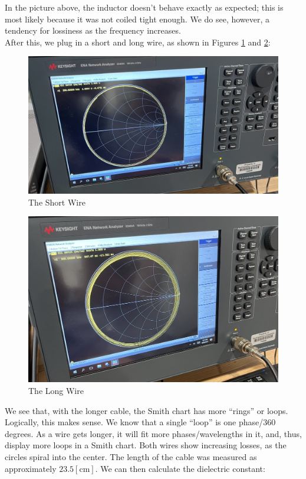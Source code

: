 \documentclass[
	letterpaper, %
	10pt, %
]{CSUniSchoolLabReport}
\begin{document}
In the picture above, the inductor doesn't behave exactly as expected; this is most likely because it was not coiled tight enough. We do see, however, a tendency for lossiness as the frequency increases.\\

After this, we plug in a short and long wire, as shown in Figures \ref{fig:9} and \ref{fig:10}:

\begin{figure}[H]
  \centering
  \includegraphics[width=.75\textwidth]{Figures/Lab One/ShortWire.png}
  \caption{The Short Wire}
  \label{fig:9}
\end{figure}

\begin{figure}[H]
  \centering
  \includegraphics[width=.75\textwidth]{Figures/Lab One/LongWire.png}
  \caption{The Long Wire}
  \label{fig:10}
\end{figure}

We see that, with the longer cable, the Smith chart has more ``rings'' or loops. Logically, this makes sense. We know that a single ``loop'' is one phase/360 degrees. As a wire gets longer, it will fit more phases/wavelengths in it, and, thus, display more loops in a Smith chart. Both wires show increasing losses, as the circles spiral into the center. The length of the cable was measured as approximately $23.5[\si{\centi\meter}]$. We can then calculate the dielectric constant:
\end{document}
